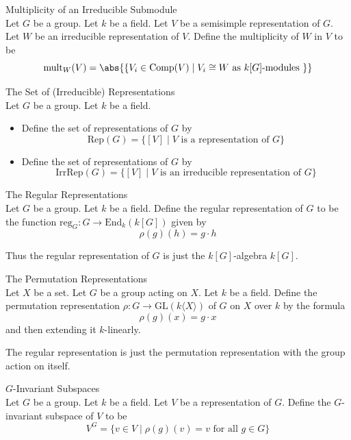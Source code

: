 \documentclass[a4paper]{article}
\begin{document}
\begin{defn}{Multiplicity of an Irreducible Submodule}{}\\
Let $G$ be a group. Let $k$ be a field. Let $V$ be a semisimple representation of $G$. Let $W$ be an irreducible representation of $V$. Define the multiplicity of $W$ in $V$ to be $$\text{mult}_W(V)=\abs{\{V_i\in\text{Comp}(V)\;|\;V_i\cong W\text{ as }k[G]\text{-modules }\}}$$
\end{defn}

\begin{defn}{The Set of (Irreducible) Representations}{}\\
Let $G$ be a group. Let $k$ be a field. 
\begin{itemize}
\item Define the set of representations of $G$ by $$\text{Rep}(G)=\{[V]\;|\;V\text{ is a representation of }G\}$$
\item Define the set of representations of $G$ by $$\text{IrrRep}(G)=\{[V]\;|\;V\text{ is an irreducible representation of }G\}$$
\end{itemize}
\end{defn}

\begin{defn}{The Regular Representations}{}\\
Let $G$ be a group. Let $k$ be a field. Define the regular representation of $G$ to be the function $\text{reg}_G:G\to\text{End}_k(k[G])$ given by $$\rho(g)(h)=g\cdot h$$
\end{defn}

Thus the regular representation of $G$ is just the $k[G]$-algebra $k[G]$. 

\begin{defn}{The Permutation Representations}{}\\
Let $X$ be a set. Let $G$ be a group acting on $X$. Let $k$ be a field. Define the permutation representation $\rho:G\to\text{GL}(k\langle X\rangle)$ of $G$ on $X$ over $k$ by the formula $$\rho(g)(x)=g\cdot x$$ and then extending it $k$-linearly. 
\end{defn}

The regular representation is just the permutation representation with the group action on itself. 

\begin{defn}{$G$-Invariant Subspaces}{}\\
Let $G$ be a group. Let $k$ be a field. Let $V$ be a representation of $G$. Define the $G$-invariant subspace of $V$ to be $$V^G=\{v\in V\;|\;\rho(g)(v)=v\text{ for all }g\in G\}$$
\end{defn}
\end{document}
